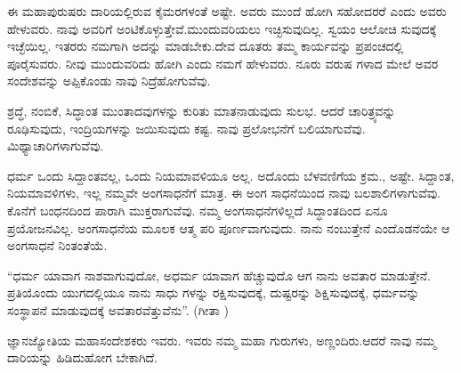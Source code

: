 ಈ ಮಹಾಪುರುಷರು ದಾರಿಯಲ್ಲಿರುವ ಕೈಮರಗಳಂತೆ ಅಷ್ಟೇ. ಅವರು ಮುಂದೆ ಹೋಗಿ ಸಹೋದರರೆ ಎಂದು ಅವರು ಹೇಳುವರು. ನಾವು ಅವರಿಗೆ ಅಂಟಿಕೊಳ್ಳುತ್ತೇವೆ.ಮುಂದುವರಿಯಲು ಇಚ್ಛಿಸುವುದಿಲ್ಲ. ಸ್ವಯಂ ಆಲೋಚಿ ಸುವುದಕ್ಕೆ ಇಚ್ಛೆಯಿಲ್ಲ. ಇತರರು ನಮಗಾಗಿ ಅದನ್ನು ಮಾಡಬೇಕು.ದೇವ ದೂತರು ತಮ್ಮ ಕಾರ್ಯವನ್ನು ಪ್ರಪಂಚದಲ್ಲಿ ಪೂರೈಸುವರು. ನೀವು ಮುಂದುವರಿದು ಹೋಗಿ ಎಂದು ನಮಗೆ ಹೇಳುವರು. ನೂರು ವರುಷ ಗಳಾದ ಮೇಲೆ ಅವರ ಸಂದೇಶವನ್ನು ಅಪ್ಪಿಕೊಂಡು ನಾವು ನಿದ್ರೆಹೋಗುವೆವು.

ಶ್ರದ್ಧೆ, ನಂಬಿಕೆ, ಸಿದ್ಧಾಂತ ಮುಂತಾದವುಗಳನ್ನು ಕುರಿತು ಮಾತನಾಡುವುದು ಸುಲಭ. ಆದರೆ ಚಾರಿತ್ರ್ಯವನ್ನು ರೂಢಿಸುವುದು, ಇಂದ್ರಿಯಗಳನ್ನು ಜಯಿಸುವುದು ಕಷ್ಟ. ನಾವು ಪ್ರಲೋಭನೆಗೆ ಬಲಿಯಾಗುವೆವು. ಮಿಥ್ಯಾಚಾರಿಗಳಾಗುವೆವು.

ಧರ್ಮ ಒಂದು ಸಿದ್ದಾಂತವಲ್ಲ, ಒಂದು ನಿಯಮಾವಳಿಯೂ ಅಲ್ಲ. ಅದೊಂದು ಬೆಳವಣಿಗೆಯ ಕ್ರಮ., ಅಷ್ಟೇ. ಸಿದ್ದಾಂತ, ನಿಯಮಾವಳಿಗಳು, ಇಲ್ಲ ನಮ್ಮವೇ ಅಂಗಸಾಧನೆಗೆ ಮಾತ್ರ. ಈ ಅಂಗ ಸಾಧನೆಯಿಂದ ನಾವು ಬಲಶಾಲಿಗಳಾಗುವೆವು. ಕೊನೆಗೆ ಬಂಧನದಿಂದ ಪಾರಾಗಿ ಮುಕ್ತರಾಗುವೆವು. ನಮ್ಮ ಅಂಗಸಾಧನೆಗಳಿಲ್ಲದೆ ಸಿದ್ಧಾಂತದಿಂದ ಏನೂ ಪ್ರಯೋಜನವಿಲ್ಲ. ಅಂಗಸಾಧನೆಯ ಮೂಲಕ ಆತ್ಮ ಪರಿ ಪೂರ್ಣವಾಗುವುದು. ನಾನು ನಂಬುತ್ತೇನೆ ಎಂದೊಡನೆಯೇ ಆ ಅಂಗಸಾಧನೆ ನಿಂತಂತೆಯೆ.

“ಧರ್ಮ ಯಾವಾಗ ನಾಶವಾಗುವುದೋ, ಅಧರ್ಮ ಯಾವಾಗ ಹೆಚ್ಚುವುದೊ ಆಗ ನಾನು ಅವತಾರ ಮಾಡುತ್ತೇನೆ. ಪ್ರತಿಯೊಂದು ಯುಗದಲ್ಲಿಯೂ ನಾನು ಸಾಧು ಗಳನ್ನು ರಕ್ಷಿಸುವುದಕ್ಕೆ, ದುಷ್ಟರನ್ನು ಶಿಕ್ಷಿಸುವುದಕ್ಕೆ, ಧರ್ಮವನ್ನು ಸಂಸ್ಥಾಪನೆ ಮಾಡುವುದಕ್ಕೆ ಅವತಾರವೆತ್ತುವೆನು”. (ಗೀತಾ )

ಜ್ಞಾನಜ್ಯೋತಿಯ ಮಹಾಸಂದೇಶಕರು ಇವರು. ಇವರು ನಮ್ಮ ಮಹಾ ಗುರುಗಳು, ಅಣ್ಣಂದಿರು.ಆದರೆ ನಾವು ನಮ್ಮ ದಾರಿಯನ್ನು ಹಿಡಿದುಹೋಗ ಬೇಕಾಗಿದೆ.

